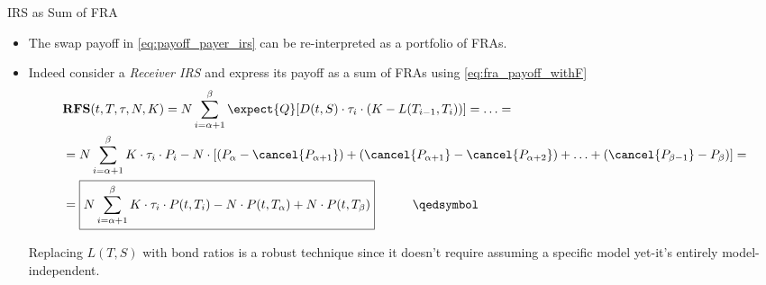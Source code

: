 \documentclass{beamer}
\begin{document}
\begin{frame}{IRS as Sum of FRA}
	\begin{itemize}
		\item The swap payoff in \cref{eq:payoff_payer_irs} can be re-interpreted as a portfolio of FRAs.
		\item Indeed consider a \emph{Receiver IRS} and express its payoff as a sum of FRAs using \cref{eq:fra_payoff_withF}
		\begin{equation}
			\begin{aligned}
				&\textbf{RFS}(t,T,\tau,N,K) = 	N\sum_{i=\alpha+1}^{\beta}\expect{Q}[D(t,S)\cdot\tau_i\cdot(K - L(T_{i-1},T_i))]= \ldots =\\
				&=N\sum_{i=\alpha+1}^{\beta}K\cdot \tau_i\cdot P_i-N\cdot [(P_\alpha -\cancel{P_{\alpha+1}}) + (\cancel{P_{\alpha+1}} - \cancel{P_{\alpha+2}}) + \ldots + (\cancel{P_{\beta-1}} - P_{\beta})] =\\
				&=\boxed{N\sum_{i=\alpha+1}^{\beta}K\cdot\tau_i\cdot P(t,T_i)-N\cdot P(t,T_\alpha)+N\cdot P(t,T_\beta)}\quad\quad\quad\qedsymbol
			\end{aligned}
			\label{eq:swap_as_sum_fra}
		\end{equation}
		\begin{tcolorbox}[colback=gray!5, colframe=maincolor, arc=0mm, boxrule=0.5pt]
		\footnotesize
		Replacing $L(T,S)$ with bond ratios is a robust technique since it doesn't require assuming a specific model yet-it's entirely model-independent.
		\end{tcolorbox}
	\end{itemize}
\end{frame}
\end{document}
